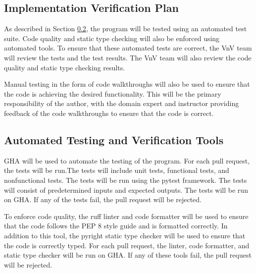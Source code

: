 \documentclass[12pt, titlepage]{article}
\begin{document}
\subsection{Implementation Verification Plan}

As described in Section \ref{sec:AutomatedTesting}, the \progname{} program will
be tested using an automated test suite. Code quality and static type checking
will also be enforced using automated tools. To ensure that these automated
tests are correct, the VnV team will review the tests and the test results. The
VnV team will also review the code quality and static type checking results.

Manual testing in the form of code walkthroughs will also be used to ensure that
the code is achieving the desired functionality. This will be the primary
responsibility of the author, with the domain expert and instructor providing
feedback of the code walkthroughs to ensure that the code is correct.




\subsection{Automated Testing and Verification Tools}
\label{sec:AutomatedTesting}

GHA will be used to automate the testing of the \progname{} program. For
each pull request, the tests will be run.The tests will include unit tests,
functional tests, and nonfunctional tests. The tests will be run using the
pytest framework. The tests will consist of predetermined inputs and expected
outputs. The tests will be run on GHA. If any of the tests fail, the
pull request will be rejected.

To enforce code quality, the ruff linter and code formatter will be used to
ensure that the code follows the PEP 8 style guide and is formatted correctly.
In addition to this tool, the pyright static type checker will be used to ensure
that the code is correctly typed. For each pull request, the linter, code
formatter, and static type checker will be run on GHA. If any of
these tools fail, the pull request will be rejected.
\end{document}
